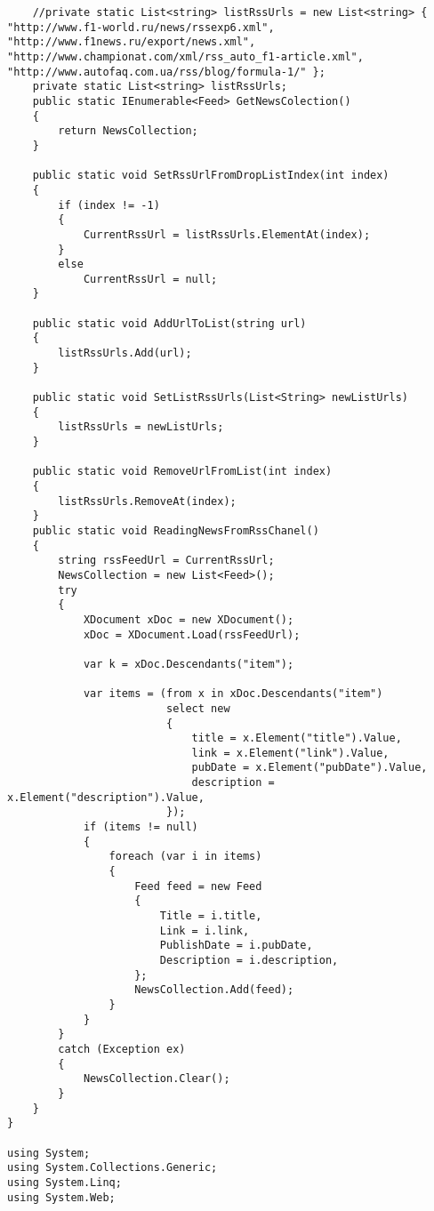 \documentclass[14pt,a4paper]{extreport}
\begin{document}
\begin{landscape}
\begin{lstlisting}
    //private static List<string> listRssUrls = new List<string> { "http://www.f1-world.ru/news/rssexp6.xml", "http://www.f1news.ru/export/news.xml", "http://www.championat.com/xml/rss_auto_f1-article.xml", "http://www.autofaq.com.ua/rss/blog/formula-1/" };
    private static List<string> listRssUrls;
    public static IEnumerable<Feed> GetNewsColection()
    {
        return NewsCollection;
    }

    public static void SetRssUrlFromDropListIndex(int index)
    {
        if (index != -1)
        {
            CurrentRssUrl = listRssUrls.ElementAt(index);
        }
        else
            CurrentRssUrl = null;
    }

    public static void AddUrlToList(string url)
    {
        listRssUrls.Add(url);
    }

    public static void SetListRssUrls(List<String> newListUrls)
    {
        listRssUrls = newListUrls;
    }

    public static void RemoveUrlFromList(int index)
    {
        listRssUrls.RemoveAt(index);
    }
    public static void ReadingNewsFromRssChanel()
    {
        string rssFeedUrl = CurrentRssUrl;
        NewsCollection = new List<Feed>();
        try
        {
            XDocument xDoc = new XDocument();
            xDoc = XDocument.Load(rssFeedUrl);

            var k = xDoc.Descendants("item");
          
            var items = (from x in xDoc.Descendants("item")
                         select new
                         {
                             title = x.Element("title").Value,
                             link = x.Element("link").Value,
                             pubDate = x.Element("pubDate").Value,
                             description = x.Element("description").Value,
                         });
            if (items != null)
            {
                foreach (var i in items)
                {
                    Feed feed = new Feed
                    {
                        Title = i.title,
                        Link = i.link,
                        PublishDate = i.pubDate,
                        Description = i.description,
                    };
                    NewsCollection.Add(feed);
                }
            }
        }
        catch (Exception ex)
        {
            NewsCollection.Clear();
        }
    }
}

using System;
using System.Collections.Generic;
using System.Linq;
using System.Web;


\end{lstlisting}
\end{landscape}
\end{document}
